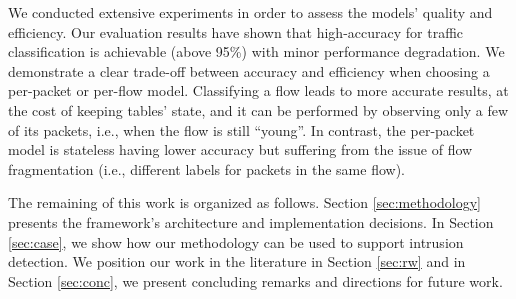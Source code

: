 We conducted extensive experiments in order to assess the models' quality and efficiency.
Our evaluation results have shown that high-accuracy for traffic classification is achievable (above  95\%) with minor performance degradation. 
We demonstrate a clear trade-off between accuracy and efficiency when choosing a per-packet or per-flow model. 
Classifying a flow  leads to more accurate results, at the cost of keeping tables' state, and it can be performed by observing only a few of its packets, i.e., when the flow is still ``young''. In contrast, the per-packet model is stateless having lower accuracy but suffering from the issue of flow fragmentation (i.e., different labels for packets in the same flow).





The remaining of this work is organized as follows. Section \ref{sec:methodology} presents the framework's architecture and implementation decisions. In Section \ref{sec:case}, we show how our methodology can be used to support intrusion detection. We position our work in the literature in Section \ref{sec:rw} and in Section \ref{sec:conc}, we present concluding remarks and directions for future work.



